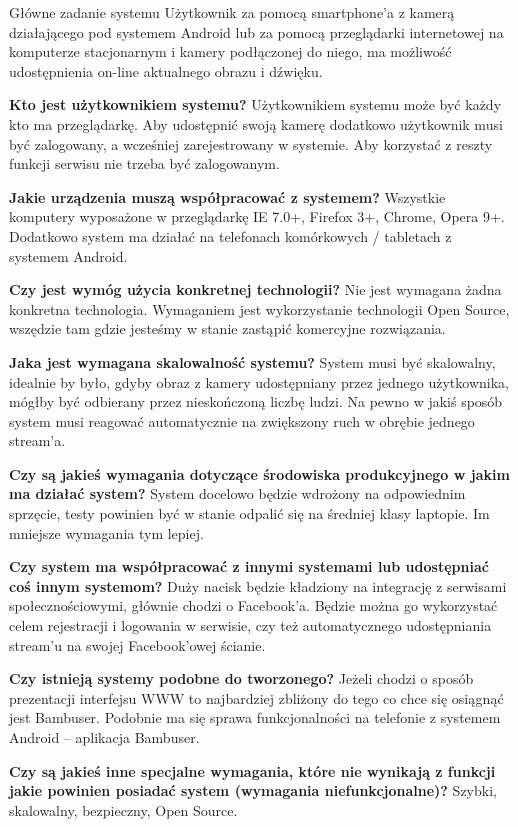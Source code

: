 \begin{userstory}{Główne zadanie systemu}
Użytkownik za pomocą smartphone'a z kamerą działającego pod systemem Android lub za pomocą przeglądarki internetowej na komputerze stacjonarnym i kamery podłączonej do niego, ma możliwość udostępnienia on-line aktualnego obrazu i dźwięku.
    \begin{questions}
        \item{
            \textbf{Kto jest użytkownikiem systemu?} Użytkownikiem systemu może być każdy kto ma przeglądarkę. Aby udostępnić swoją kamerę dodatkowo użytkownik musi być zalogowany, a wcześniej zarejestrowany w systemie. Aby korzystać z reszty funkcji serwisu nie trzeba być zalogowanym.
        }
        \item{
            \textbf{Jakie urządzenia muszą współpracować z systemem?} Wszystkie komputery wyposażone w przeglądarkę IE 7.0+, Firefox 3+, Chrome, Opera 9+. Dodatkowo system ma działać na telefonach komórkowych / tabletach z systemem Android.
        }
        \item{
            \textbf{Czy jest wymóg użycia konkretnej technologii?} Nie jest wymagana żadna konkretna technologia. Wymaganiem jest wykorzystanie technologii Open Source, wszędzie tam gdzie jesteśmy w stanie zastąpić komercyjne rozwiązania.
        }
        \item{
            \textbf{Jaka jest wymagana skalowalność systemu?} System musi być skalowalny, idealnie by było, gdyby obraz z kamery udostępniany przez jednego użytkownika, mógłby być odbierany przez nieskończoną liczbę ludzi. Na pewno w jakiś sposób system musi reagować automatycznie na zwiększony ruch w obrębie jednego stream'a.
        }
        \item{
            \textbf{Czy są jakieś wymagania dotyczące środowiska produkcyjnego w jakim ma działać system?} System docelowo będzie wdrożony na odpowiednim sprzęcie, testy powinien być w stanie odpalić się na średniej klasy laptopie. Im mniejsze wymagania tym lepiej.
        }
        \item{
            \textbf{Czy system ma współpracować z innymi systemami lub udostępniać coś innym systemom?} Duży nacisk będzie kładziony na integrację z serwisami społecznościowymi, głównie chodzi o Facebook'a. Będzie można go wykorzystać celem rejestracji i logowania w serwisie, czy też automatycznego udostępniania stream'u na swojej Facebook'owej ścianie.
        }
        \item{
            \textbf{Czy istnieją systemy podobne do tworzonego?} Jeżeli chodzi o sposób prezentacji interfejsu WWW to najbardziej zbliżony do tego co chce się osiągnąć jest Bambuser. Podobnie ma się sprawa funkcjonalności na telefonie z systemem Android -- aplikacja Bambuser.
        }
        \item{
            \textbf{Czy są jakieś inne specjalne wymagania, które nie wynikają z funkcji jakie powinien posiadać system (wymagania niefunkcjonalne)?} Szybki, skalowalny, bezpieczny, Open Source.
        }
    \end{questions}
\end{userstory}


